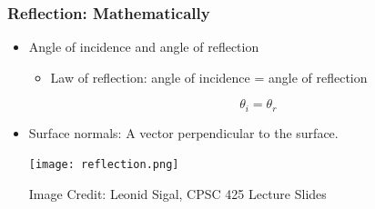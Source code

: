 \documentclass[12pt]{beamer}
\begin{document}
  \begin{frame}
    \frametitle{Reflection: Mathematically}
    \begin{itemize}
      \item Angle of incidence and angle of reflection
      \begin{itemize}
        \item Law of reflection: angle of incidence = angle of reflection

        \[
          \theta_i = \theta_r
        \]
      \end{itemize}
      \item Surface normals: A vector perpendicular to the surface.

      \texttt{[image: reflection.png]}

      \caption{\tiny{Image Credit: Leonid Sigal, CPSC 425 Lecture Slides}}





    \end{itemize}
  \end{frame}
\end{document}

